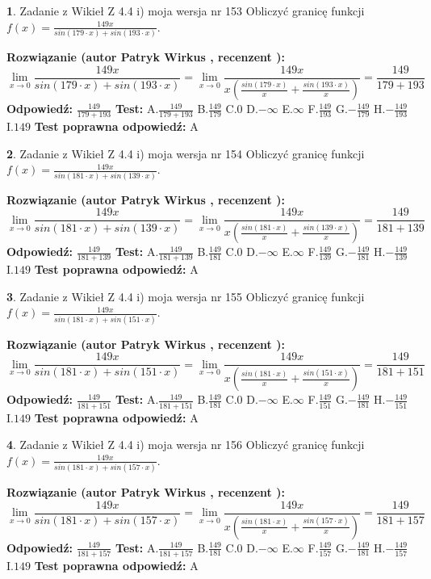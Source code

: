 \documentclass[12pt, a4paper]{article}
\theoremstyle{definition} %
\newtheorem{zad}{}
\newcommand{\zadStart}[1]{\begin{zad}#1\newline}
\newcommand{\zadStop}{\end{zad}}
\newcommand{\rozwStart}[2]{\noindent \textbf{Rozwiązanie (autor #1 , recenzent #2): }\newline}
\newcommand{\rozwStop}{\newline}
\newcommand{\odpStart}{\noindent \textbf{Odpowiedź:}\newline}
\newcommand{\odpStop}{\newline}
\newcommand{\testStart}{\noindent \textbf{Test:}\newline}
\newcommand{\testStop}{\newline}
\newcommand{\kluczStart}{\noindent \textbf{Test poprawna odpowiedź:}\newline}
\newcommand{\kluczStop}{\newline}
\begin{document}
\zadStart{Zadanie z Wikieł Z 4.4 i) moja wersja nr 153}
Obliczyć granicę funkcji $f(x)=\frac{149x}{sin(179\cdot x) +sin(193\cdot x)}$.
\zadStop
\rozwStart{Patryk Wirkus}{}
$$\lim\limits_{x\to 0}\frac{149x}{sin(179\cdot x) +sin(193\cdot x)}=\lim\limits_{x\to 0}\frac{149x}{x(\frac{sin(179\cdot x)}{x}+\frac{sin(193\cdot x)}{x})}=\frac{149}{179+193}$$
\rozwStop
\odpStart
$\frac{149}{179+193}$
\odpStop
\testStart
A.$\frac{149}{179+193}$
B.$\frac{149}{179}$
C.$0$
D.$-\infty$
E.$\infty$
F.$\frac{149}{193}$
G.$-\frac{149}{179}$
H.$-\frac{149}{193}$
I.$149$
\testStop
\kluczStart
A
\kluczStop



\zadStart{Zadanie z Wikieł Z 4.4 i) moja wersja nr 154}
Obliczyć granicę funkcji $f(x)=\frac{149x}{sin(181\cdot x) +sin(139\cdot x)}$.
\zadStop
\rozwStart{Patryk Wirkus}{}
$$\lim\limits_{x\to 0}\frac{149x}{sin(181\cdot x) +sin(139\cdot x)}=\lim\limits_{x\to 0}\frac{149x}{x(\frac{sin(181\cdot x)}{x}+\frac{sin(139\cdot x)}{x})}=\frac{149}{181+139}$$
\rozwStop
\odpStart
$\frac{149}{181+139}$
\odpStop
\testStart
A.$\frac{149}{181+139}$
B.$\frac{149}{181}$
C.$0$
D.$-\infty$
E.$\infty$
F.$\frac{149}{139}$
G.$-\frac{149}{181}$
H.$-\frac{149}{139}$
I.$149$
\testStop
\kluczStart
A
\kluczStop



\zadStart{Zadanie z Wikieł Z 4.4 i) moja wersja nr 155}
Obliczyć granicę funkcji $f(x)=\frac{149x}{sin(181\cdot x) +sin(151\cdot x)}$.
\zadStop
\rozwStart{Patryk Wirkus}{}
$$\lim\limits_{x\to 0}\frac{149x}{sin(181\cdot x) +sin(151\cdot x)}=\lim\limits_{x\to 0}\frac{149x}{x(\frac{sin(181\cdot x)}{x}+\frac{sin(151\cdot x)}{x})}=\frac{149}{181+151}$$
\rozwStop
\odpStart
$\frac{149}{181+151}$
\odpStop
\testStart
A.$\frac{149}{181+151}$
B.$\frac{149}{181}$
C.$0$
D.$-\infty$
E.$\infty$
F.$\frac{149}{151}$
G.$-\frac{149}{181}$
H.$-\frac{149}{151}$
I.$149$
\testStop
\kluczStart
A
\kluczStop



\zadStart{Zadanie z Wikieł Z 4.4 i) moja wersja nr 156}
Obliczyć granicę funkcji $f(x)=\frac{149x}{sin(181\cdot x) +sin(157\cdot x)}$.
\zadStop
\rozwStart{Patryk Wirkus}{}
$$\lim\limits_{x\to 0}\frac{149x}{sin(181\cdot x) +sin(157\cdot x)}=\lim\limits_{x\to 0}\frac{149x}{x(\frac{sin(181\cdot x)}{x}+\frac{sin(157\cdot x)}{x})}=\frac{149}{181+157}$$
\rozwStop
\odpStart
$\frac{149}{181+157}$
\odpStop
\testStart
A.$\frac{149}{181+157}$
B.$\frac{149}{181}$
C.$0$
D.$-\infty$
E.$\infty$
F.$\frac{149}{157}$
G.$-\frac{149}{181}$
H.$-\frac{149}{157}$
I.$149$
\testStop
\kluczStart
A
\kluczStop
\end{document}
